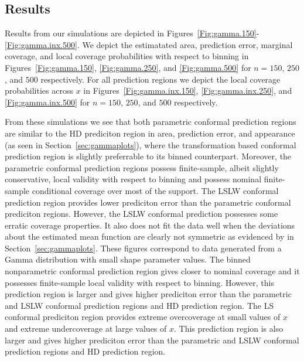 \documentclass[11pt]{article}\usepackage[]{graphicx}\usepackage[]{color}
\begin{document}
\newpage
\subsection{Results}
\label{sec:Gamma-Results}

Results from our simulations are depicted in 
Figures~\ref{Fig:gamma.150}-\ref{Fig:gamma.inx.500}.  
We depict the estimatated area, prediction error, marginal coverage, and 
local coverage probabilities with respect to binning in 
Figures~\ref{Fig:gamma.150}, \ref{Fig:gamma.250}, and \ref{Fig:gamma.500} 
for $n = 150$, $250$, and $500$ respectively.  For all prediction 
regions we depict the local coverage probabilities across $x$ in
Figures~\ref{Fig:gamma.inx.150}, \ref{Fig:gamma.inx.250}, and 
\ref{Fig:gamma.inx.500} for $n = 150$, $250$, and $500$ respectively.

From these simulations we see that both parametric conformal prediction 
regions are similar to the HD prediciton region in area, prediction error, and 
appearance (as seen in Section~\ref{sec:gammaplots}), where the transformation 
based conformal prediction region is slightly preferrable to its binned counterpart.  
Moreover, the parametric conformal prediction regions possess finite-sample, 
albeit slightly conservative, local validity with respect to binning and 
possess nominal finite-sample conditional coverage over most of the support. 
The LSLW conformal prediction region provides lower prediciton error than the 
parametric conformal prediciton regions.  However, the LSLW conformal 
prediction possesses some erratic coverage properties.  
It also does not fit the data well when the deviations about the 
estimated mean function are clearly not symmetric as evidenced by 
in Section~\ref{sec:gammaplots}.  These figures correspond to data generated 
from a Gamma distribution with small shape parameter values.  
The binned nonparametric conformal prediction region gives closer to nominal 
coverage and it possesses finite-sample local validity with respect to 
binning.  However, this prediction region is larger and gives higher 
prediciton error than the parametric and LSLW conformal prediction 
regions and HD prediction region.  The LS conformal prediciton region 
provides extreme overcoverage at small values of $x$ and extreme 
undercoverage at large values of $x$.  This prediction region is also larger 
and gives higher prediciton error than the parametric and LSLW conformal 
prediction regions and HD prediction region.
\end{document}
